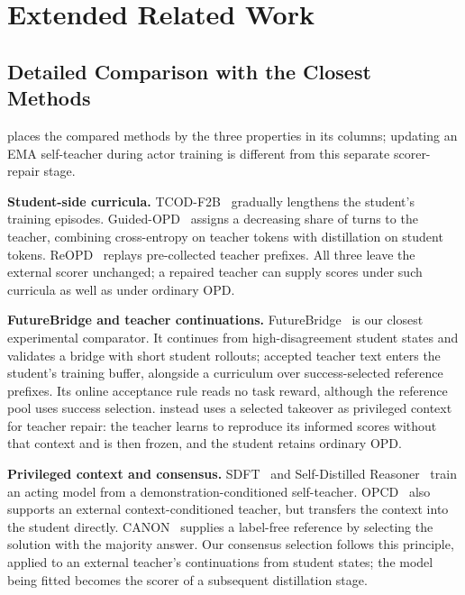 
\clearpage
\section{Extended Related Work}
\label{app:relwork}

\subsection{Detailed Comparison with the Closest Methods}
\label{app:compare}



 places the compared methods by the three properties in its columns; updating an EMA self-teacher during actor training is different from this separate scorer-repair stage.

\textbf{Student-side curricula.} TCOD-F2B~\citep{tcod2026} gradually lengthens the student's training episodes. Guided-OPD~\citep{guidedopd2026} assigns a decreasing share of turns to the teacher, combining cross-entropy on teacher tokens with distillation on student tokens. ReOPD~\citep{reopd2026} replays pre-collected teacher prefixes. All three leave the external scorer unchanged; a repaired teacher can supply scores under such curricula as well as under ordinary OPD.

\textbf{FutureBridge and teacher continuations.} FutureBridge~\citep{futurebridge2026} is our closest experimental comparator. It continues from high-disagreement student states and validates a bridge with short student rollouts; accepted teacher text enters the student's training buffer, alongside a curriculum over success-selected reference prefixes. Its online acceptance rule reads no task reward, although the reference pool uses success selection. \method{} instead uses a selected takeover as privileged context for teacher repair: the teacher learns to reproduce its informed scores without that context and is then frozen, and the student retains ordinary OPD.

\textbf{Privileged context and consensus.} SDFT~\citep{sdft2026} and Self-Distilled Reasoner~\citep{opsd2026} train an acting model from a demonstration-conditioned self-teacher. OPCD~\citep{opcd2026} also supports an external context-conditioned teacher, but transfers the context into the student directly. CANON~\citep{canon2026} supplies a label-free reference by selecting the solution with the majority answer. Our consensus selection follows this principle, applied to an external teacher's continuations from student states; the model being fitted becomes the scorer of a subsequent distillation stage.

